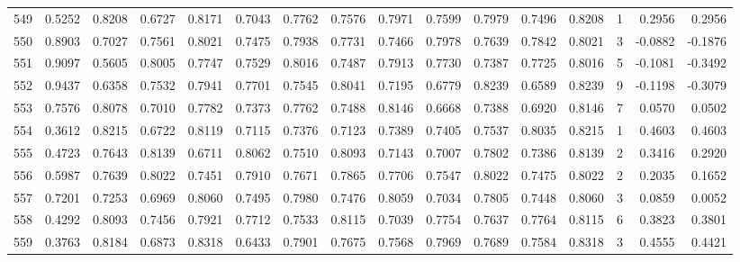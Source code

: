 \begin{tabular}{lrrrrrrrrrrrrrrr}
549 &      0.5252 &  0.8208 &  0.6727 &  0.8171 &  0.7043 &  0.7762 &  0.7576 &  0.7971 &  0.7599 &  0.7979 &   0.7496 &     0.8208 &      1 &                    0.2956 &                     0.2956 \\
550 &      0.8903 &  0.7027 &  0.7561 &  0.8021 &  0.7475 &  0.7938 &  0.7731 &  0.7466 &  0.7978 &  0.7639 &   0.7842 &     0.8021 &      3 &                   -0.0882 &                    -0.1876 \\
551 &      0.9097 &  0.5605 &  0.8005 &  0.7747 &  0.7529 &  0.8016 &  0.7487 &  0.7913 &  0.7730 &  0.7387 &   0.7725 &     0.8016 &      5 &                   -0.1081 &                    -0.3492 \\
552 &      0.9437 &  0.6358 &  0.7532 &  0.7941 &  0.7701 &  0.7545 &  0.8041 &  0.7195 &  0.6779 &  0.8239 &   0.6589 &     0.8239 &      9 &                   -0.1198 &                    -0.3079 \\
553 &      0.7576 &  0.8078 &  0.7010 &  0.7782 &  0.7373 &  0.7762 &  0.7488 &  0.8146 &  0.6668 &  0.7388 &   0.6920 &     0.8146 &      7 &                    0.0570 &                     0.0502 \\
554 &      0.3612 &  0.8215 &  0.6722 &  0.8119 &  0.7115 &  0.7376 &  0.7123 &  0.7389 &  0.7405 &  0.7537 &   0.8035 &     0.8215 &      1 &                    0.4603 &                     0.4603 \\
555 &      0.4723 &  0.7643 &  0.8139 &  0.6711 &  0.8062 &  0.7510 &  0.8093 &  0.7143 &  0.7007 &  0.7802 &   0.7386 &     0.8139 &      2 &                    0.3416 &                     0.2920 \\
556 &      0.5987 &  0.7639 &  0.8022 &  0.7451 &  0.7910 &  0.7671 &  0.7865 &  0.7706 &  0.7547 &  0.8022 &   0.7475 &     0.8022 &      2 &                    0.2035 &                     0.1652 \\
557 &      0.7201 &  0.7253 &  0.6969 &  0.8060 &  0.7495 &  0.7980 &  0.7476 &  0.8059 &  0.7034 &  0.7805 &   0.7448 &     0.8060 &      3 &                    0.0859 &                     0.0052 \\
558 &      0.4292 &  0.8093 &  0.7456 &  0.7921 &  0.7712 &  0.7533 &  0.8115 &  0.7039 &  0.7754 &  0.7637 &   0.7764 &     0.8115 &      6 &                    0.3823 &                     0.3801 \\
559 &      0.3763 &  0.8184 &  0.6873 &  0.8318 &  0.6433 &  0.7901 &  0.7675 &  0.7568 &  0.7969 &  0.7689 &   0.7584 &     0.8318 &      3 &                    0.4555 &                     0.4421 \\

\end{tabular}
